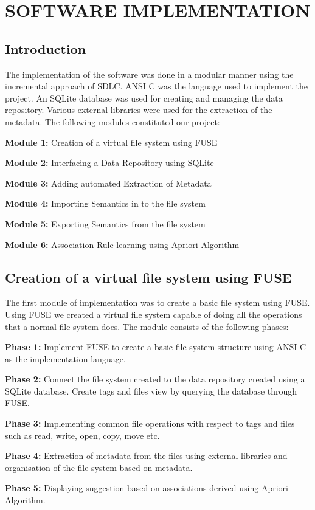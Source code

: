 \chapter{SOFTWARE IMPLEMENTATION}
\section{Introduction}
The implementation of the software was done in a modular manner using the incremental approach of SDLC. ANSI C was the language used to implement the project. An SQLite database was used for creating and managing the data repository. Various external libraries were used for the extraction of the metadata. The following modules constituted our project:
\begin{list}{•}{•}
\item \textbf{Module 1:} Creation of a virtual file system using FUSE
\item \textbf{Module 2:} Interfacing a Data Repository using SQLite
\item \textbf{Module 3:} Adding automated Extraction of Metadata 
\item \textbf{Module 4:} Importing Semantics in to the file system
\item \textbf{Module 5:} Exporting Semantics from the file system
\item \textbf{Module 6:} Association Rule learning using Apriori Algorithm
\end{list}

\section{Creation of a virtual file system using FUSE}

The first module of implementation was to create a basic file system using FUSE. Using FUSE we created a virtual file system capable of doing all the operations that a normal file system does.
The module consists of the following phases:
\begin{list}{•}{•}

\item \textbf{Phase 1:} Implement FUSE to create a basic file system structure using ANSI C as the implementation language.

\item \textbf{Phase 2:} Connect the file system created to the data repository created using a SQLite database. Create tags and files view by querying the database through FUSE.

\item \textbf{Phase 3:} Implementing common file operations with respect to tags and files such as read, write, open, copy, move etc.

\item \textbf{Phase 4:} Extraction of metadata from the files using external libraries and organisation of the file system based on metadata.

\item \textbf{Phase 5:} Displaying suggestion based on associations derived using Apriori Algorithm. 
\end{list}

